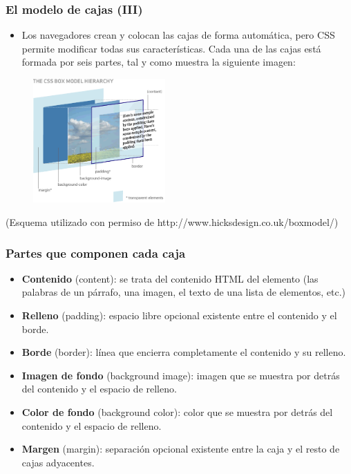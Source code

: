 \documentclass[ucs]{beamer}
\begin{document}

\begin{frame}
\frametitle{El modelo de cajas (III)}

\begin{itemize}
  \item Los navegadores crean y colocan las cajas de forma automática, pero CSS permite modificar todas sus características. Cada una de las cajas está formada por seis partes, tal y como muestra la siguiente imagen:
\end{itemize}


\begin{center}
\begin{figure}[p]
\includegraphics[width=0.45\textwidth]{figs/f0403.png}
\end{figure}
\end{center}
{\footnotesize
(Esquema utilizado con permiso de http://www.hicksdesign.co.uk/boxmodel/)
}
\end{frame}


\begin{frame}
\frametitle{Partes que componen cada caja}

\begin{itemize}
  \item {\bf Contenido} (content): se trata del contenido HTML del elemento (las palabras de un párrafo, una imagen, el texto de una lista de elementos, etc.)
  \item {\bf Relleno} (padding): espacio libre opcional existente entre el contenido y el borde.
  \item {\bf Borde} (border): línea que encierra completamente el contenido y su relleno.
  \item {\bf Imagen de fondo} (background image): imagen que se muestra por detrás del contenido y el espacio de relleno.
  \item {\bf Color de fondo} (background color): color que se muestra por detrás del contenido y el espacio de relleno.
  \item {\bf Margen} (margin): separación opcional existente entre la caja y el resto de cajas adyacentes.
\end{itemize}

\end{frame}
\end{document}
